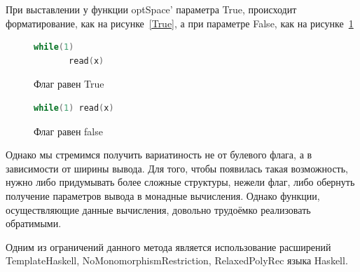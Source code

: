 \documentclass{matmex-diploma-custom}
\begin{document}
При выставлении у функции optSpace' параметра True, происходит форматирование, как на рисунке~\ref{True}, а при параметре False, как на рисунке~\ref{False}

\begin{figure}[h]
  \centering
  \begin{minipage}[h]{0.4\textwidth}
    \begin{lstlisting}[language = C]
    while(1)
       read(x)
    \end{lstlisting}
    \caption{Флаг равен True}
    \label{True}
  \end{minipage}
  \hfill
  \begin{minipage}[h]{0.4\textwidth}
    \begin{lstlisting}[language = C]
    while(1) read(x)
    \end{lstlisting}
    \caption{Флаг равен false}
    \label{False}
  \end{minipage}
\end{figure}



Однако мы стремимся получить вариатиность не от булевого флага, а в зависимости от ширины вывода. Для того, чтобы появилась такая возможность, нужно либо придумывать более сложные структуры, нежели флаг, либо обернуть получение параметров вывода в монадные вычисления. Однако функции, осуществляющие данные вычисления, довольно трудоёмко реализовать обратимыми.

Одним из ограничений данного метода является использование расширений 
TemplateHaskell, NoMonomorphismRestriction, RelaxedPolyRec языка Haskell.

\end{document}
